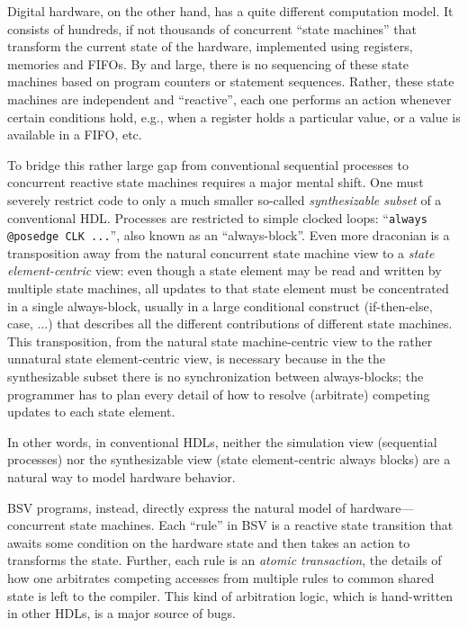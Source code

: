 Digital hardware, on the other hand, has a quite different computation
model.  It consists of hundreds, if not thousands of concurrent
``state machines'' that transform the current state of the hardware,
implemented using registers, memories and FIFOs.  By and large, there
is no sequencing of these state machines based on program counters or
statement sequences.  Rather, these state machines are independent and
``reactive'', {\ie} each one performs an action whenever certain
conditions hold, e.g., when a register holds a particular value, or a
value is available in a FIFO, etc.

To bridge this rather large gap from conventional sequential processes
to concurrent reactive state machines requires a major mental shift.
One must severely restrict code to only a much smaller so-called
\emph{synthesizable subset} of a conventional HDL.  Processes are
restricted to simple clocked loops: ``\verb|always @posedge CLK ...|'',
also known as an ``always-block''.  Even more draconian is a
transposition away from the natural concurrent state machine view to a
\emph{state element-centric} view: even though a state element may be
read and written by multiple state machines, all updates to that state
element must be concentrated in a single always-block, usually in a
large conditional construct (if-then-else, case, ...) that describes
all the different contributions of different state machines.  This
transposition, from the natural state machine-centric view to the
rather unnatural state element-centric view, is necessary because in
the the synthesizable subset there is no synchronization between
always-blocks; the programmer has to plan every detail of how to
resolve (arbitrate) competing updates to each state element.

In other words, in conventional HDLs, neither the simulation view
(sequential processes) nor the synthesizable view (state
element-centric always blocks) are a natural way to model hardware
behavior.

BSV programs, instead, directly express the natural model of
hardware--- concurrent state machines.  Each ``rule'' in BSV is a
reactive state transition that awaits some condition on the hardware
state and then takes an action to transforms the state.  Further, each
rule is an \emph{atomic transaction}, {\ie} the details of how one
arbitrates competing accesses from multiple rules to common shared
state is left to the compiler.  This kind of arbitration logic, which
is hand-written in other HDLs, is a major source of bugs.

